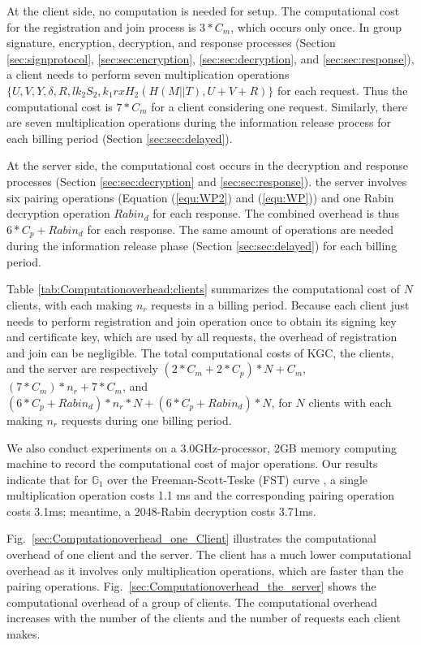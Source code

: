\documentclass[letterpaper,12pt]{article}
\begin{document}
At the client side, no computation is needed for setup. The computational cost for the registration and join process is $3\ast C_m$,  which occurs only once. In group signature, encryption, decryption, and response processes (Section \ref{sec:signprotocol}, \ref{sec:sec:encryption}, \ref{sec:sec:decryption}, and \ref{sec:sec:response}), a client needs to perform seven multiplication operations $\{U, V, Y, \delta, R, lk_2S_2, k_1rxH_2(H(M||T), U+V+R)\}$ for each request. Thus the computational cost is $7\ast C_m$ for a client considering one request. Similarly, there are seven multiplication operations during the information release process for each billing period (Section \ref{sec:sec:delayed}).

At the server side,  the computational cost occurs in the decryption and response processes (Section \ref{sec:sec:decryption} and \ref{sec:sec:response}). the server involves six pairing operations (Equation (\ref{equ:WP2}) and (\ref{equ:WP}))  and one Rabin decryption operation $Rabin_d$ for each response. The combined overhead is thus $6\ast C_p+ Rabin_d$ for each response. The same amount of operations are needed during the information release phase (Section \ref{sec:sec:delayed}) for each billing period.

Table \ref{tab:Computationoverhead:clients} summarizes the computational cost of $N$ clients, with each making $n_r$ requests in a billing period. Because each client just needs to perform registration and join operation once to obtain its signing key and certificate key, which are used by all requests, the overhead of registration and join can be negligible. The total computational costs of KGC, the clients, and the server are respectively $(2\ast C_m+2\ast C_p)\ast N+C_m$, $(7\ast C_m) \ast n_r+7\ast C_m$, and $(6\ast C_p+Rabin_d) \ast n_r*N+(6\ast C_p+Rabin_d)*N$, for $N$ clients with each making $n_r$ requests during one billing period.

We also conduct experiments on a 3.0GHz-processor, 2GB memory computing machine to record the computational cost of major operations. Our results indicate that for $\mathbb{G}_1$ over the Freeman-Scott-Teske (FST) curve \cite{freeman2010taxonomy}, a single multiplication operation costs 1.1 ms and the corresponding pairing operation costs 3.1ms;  meantime, a 2048-Rabin decryption costs 3.71ms.

Fig.~\ref{sec:Computationoverhead_one_Client} illustrates the computational overhead of one client and the server. The client has a much lower computational overhead as it involves only multiplication operations, which are faster than the pairing operations. Fig.~\ref{sec:Computationoverhead_the_server} shows the computational overhead of a group of clients. The computational overhead increases with the number of the clients and the number of requests each client makes.
\end{document}
